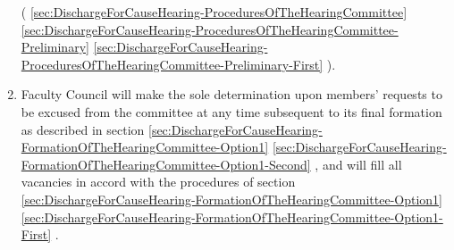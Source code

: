 \begin{enumerate}[label=\alph*)]
{							\label{sec:DischargeForCauseHearing-FormationOfTheHearingCommittee-Option1-Second}
							(
							\ref{sec:DischargeForCauseHearing-ProceduresOfTheHearingCommittee}
							\ref{sec:DischargeForCauseHearing-ProceduresOfTheHearingCommittee-Preliminary}
							\ref{sec:DischargeForCauseHearing-ProceduresOfTheHearingCommittee-Preliminary-First}
							).}
						\item{Faculty Council will make the sole determination upon members' requests to be excused from the committee at any time subsequent to its final formation as described in
							section
							\ref{sec:DischargeForCauseHearing-FormationOfTheHearingCommittee-Option1}
							\ref{sec:DischargeForCauseHearing-FormationOfTheHearingCommittee-Option1-Second}
							, and will fill all vacancies in accord with the procedures of
							section
							\ref{sec:DischargeForCauseHearing-FormationOfTheHearingCommittee-Option1}
							\ref{sec:DischargeForCauseHearing-FormationOfTheHearingCommittee-Option1-First}
							.}
					\end{enumerate}
